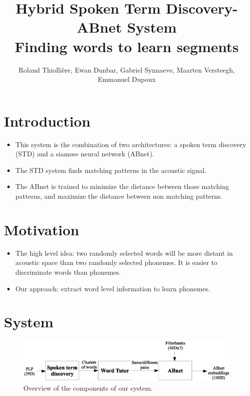 \documentclass[final]{beamer}
\title
[Interspeech (2015, Dresden, Germany)] %
{ %
Hybrid Spoken Term Discovery-ABnet System\\
Finding words to learn segments
}
\author{ %
Roland Thiolli\`ere\inst{*}, Ewan Dunbar\inst{*}, Gabriel Synnaeve\inst{*\dagger}, Maarten Versteegh\inst{*}, Emmanuel Dupoux\inst{*}
}
\institute
[ENS] %
{
\inst{*} LSCP, \'{E}cole Normale Sup\'{e}rieure / EHESS / CNRS, Paris, France\\%
\inst{\dagger} now at Facebook AI Research\\[0.5ex]
\inst{} \begin{small}\texttt{rolthiolliere@gmail.com, emd@umd.edu, gabrielsynnaeve@gmail.com, maartenversteegh@gmail.com, emmanuel.dupoux@gmail.com}\end{small}
}
\newcommand{\abnet}{{\sc ABnet}}
\begin{document}
\begin{frame}[t]
\begin{multicols}{3} %

\section{Introduction}

\begin{itemize}
\item This system is the combination of two architectures: a spoken term discovery\cite{jansenvandurme2011} (STD) and a siamese neural network\cite{synnaevedupoux2014} (\abnet{}).
\item The STD system finds matching patterns in the acoustic signal.
\item The \abnet{} is trained to minimize the distance between those matching patterns, and maximize the distance between non matching patterns.
\end{itemize}



\section{Motivation}

\begin{itemize}
\item The high level idea: two randomly selected words will be more distant in acoustic space than two randomly selected phonemes. It is easier to discriminate words than phonemes.
\item Our approach: extract word level information to learn phonemes.
\end{itemize}


\section{System}

\vspace{0.5cm}
\begin{figure}[ht!]
  \begin{center}
    \includegraphics[width=\columnwidth]{system}
    \caption{\label{fig:system}Overview of the components of our system.}
  \end{center}
\end{figure}


\end{multicols}
\end{frame}
\end{document}
